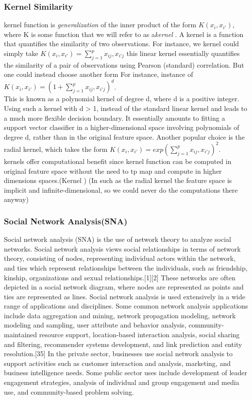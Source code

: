 \documentclass[a4paper]{article}
\begin{document}
\subsubsection{Kernel Similarity}
kernel function is   \emph{generalization} of the inner product of the form
$K (x_i , x_{i'} )$,
where K is some function that we will refer to as a\emph{kernel} . A kernel is a function that quantifies the similarity of two observations. For instance, we
kernel
could simply take
$ K (x_i , x_{i'} )=\sum_{ j=1}^{p} x_{ij} , x_{i'j}$
this linear kernel essentially quantifies the similarity of a pair of observations using Pearson (standard) correlation. But one could instead choose another form For instance, instance of
$ K (x_i , x_{i'} )=(1+\sum_{ j=1}^{p} x_{ij} , x_{i'j})^d$.\\
This is known as a polynomial kernel of degree d, where d is a positive integer. Using such a kernel with d > 1, instead of the standard linear kernel and  leads to a much more flexible decision boundary. It essentially amounts to fitting a support vector classifier in a higher-dimensional space involving polynomials of degree d, rather than in the original feature space. 
Another popular choice is the radial kernel, which takes the form
$ K (x_i , x_{i'} )=exp(\sum_{ j=1}^{p} x_{ij} , x_{i'j})^2$.\\
kernels offer computational benefit since kernel function can be 
computed in original feature space without the need to tp map
and compute in higher dimensions spaces.(Kernel )
(In such as the radial kernel  the feature space is implicit and infinite-dimensional, so we could never do the computations there anyway)
\\
\subsubsection{Social Network Analysis(SNA)}
Social network analysis (SNA) is the use of network theory to analyze social networks. Social network analysis views social relationships in terms of network theory, consisting of nodes, representing individual actors within the network, and ties which represent relationships between the individuals, such as friendship, kinship, organizations and sexual relationships.[1][2] These networks are often depicted in a social network diagram, where nodes are represented as points and ties are represented as lines.
Social network analysis is used extensively in a wide range of applications and disciplines. Some common network analysis applications include data aggregation and mining, network propagation modeling, network modeling and sampling, user attribute and behavior analysis, community-maintained resource support, location-based interaction analysis, social sharing and filtering, recommender systems development, and link prediction and entity resolution.[35] In the private sector, businesses use social network analysis to support activities such as customer interaction and analysis, marketing, and business intelligence needs. Some public sector uses include development of leader engagement strategies, analysis of individual and group engagement and media use, and community-based problem solving.
\end{document}
